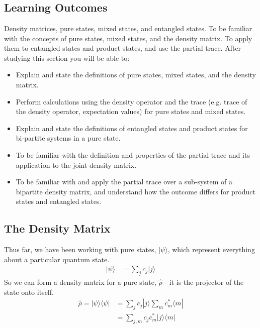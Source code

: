 \documentclass[a4paper, 11pt, normalem]{report}
\begin{document}
\chapter{}
\section{Learning Outcomes}
Density matrices, pure states, mixed states, and entangled states. 
To be familiar with the concepts of pure states, mixed states, and the density matrix. 
To apply them to entangled states and product states, and use the partial trace. 
After studying this section you will be able to:
\begin{itemize}
    \item Explain and state the definitions of pure states, mixed states, and the density matrix.
    \item Perform calculations using the density operator and the trace (e.g. trace of the density operator, expectation values) for pure states and mixed states. 
    \item Explain and state the definitions of entangled states and product states for bi-partite systems in a pure state. 
    \item To be familiar with the definition and properties of the partial trace and its application to the joint density matrix. 
    \item To be familiar with and apply the partial trace over a sub-system of a bipartite density matrix, and understand how the outcome differs for product states and entangled states. 
\end{itemize}

\section{The Density Matrix}
Thus far, we have been working with pure states, $|\psi\rangle$, which represent everything about a particular quantum state.
\begin{align}
    |\psi\rangle &= \sum_jc_j|j\rangle
\end{align}
So we can form a density matrix for a pure state, $\hat{\rho}$ - it is the projector of the state onto itself.
\begin{align}
    \hat{\rho} = |\psi\rangle\langle\psi| &= \sum_jc_j|j\rangle\sum_mc^*_m\langle m| \\
                                          &= \sum_{j,m} c_jc^*_m|j\rangle\langle m|
\end{align}
\end{document}
